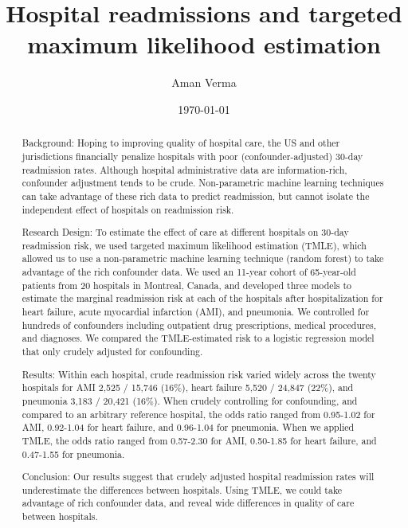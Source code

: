 \documentclass[]{article}\usepackage[]{graphicx}\usepackage[]{color}
\begin{document}
\title{Hospital readmissions and targeted maximum likelihood estimation}
\author{Aman Verma}
\date{\today}

\begin{abstract}







Background: Hoping to improving quality of hospital care, the US and other jurisdictions financially penalize hospitals with poor (confounder-adjusted) 30-day readmission rates. Although hospital administrative data are information-rich, confounder adjustment tends to be crude. Non-parametric machine learning techniques can take advantage of these rich data to predict readmission, but cannot isolate the independent effect of hospitals on readmission risk.

Research Design: To estimate the effect of care at different hospitals on 30-day readmission risk, we used targeted maximum likelihood estimation (TMLE), which allowed us to use a non-parametric machine learning technique (random forest) to take advantage of the rich confounder data. We used an 11-year cohort of 65-year-old patients from 20 hospitals in Montreal, Canada, and developed three models to estimate the marginal readmission risk at each of the hospitals after hospitalization for heart failure, acute myocardial infarction (AMI), and pneumonia. We controlled for hundreds of confounders including outpatient drug prescriptions, medical procedures, and diagnoses. We compared the TMLE-estimated risk to a logistic regression model that only crudely adjusted for confounding.

Results: Within each hospital, crude readmission risk varied widely across the twenty hospitals for AMI 2,525 / 15,746 (16\%), heart failure 5,520 / 24,847 (22\%), and pneumonia 3,183 / 20,421 (16\%). When crudely controlling for confounding, and compared to an arbitrary reference hospital, the odds ratio ranged from 0.95-1.02 for AMI, 0.92-1.04 for heart failure, and 0.96-1.04 for pneumonia. When we applied TMLE,
the odds ratio ranged from 0.57-2.30 for AMI, 0.50-1.85 for heart failure, and 0.47-1.55 for pneumonia.

Conclusion: Our results suggest that crudely adjusted hospital readmission rates will underestimate the differences between hospitals. Using TMLE, we could take advantage of rich confounder data, and reveal wide differences in quality of care between hospitals.

\end{abstract}
\end{document}
